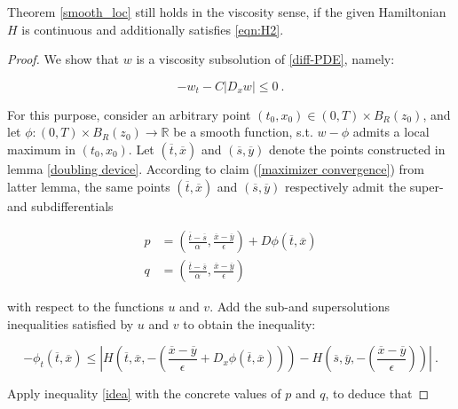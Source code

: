 \begin{theorem}
	\label{viscosity_loc}
		  	Theorem \ref{smooth_loc} still holds in the viscosity sense, if the given Hamiltonian $ H $ is continuous and additionally satisfies \eqref{eqn:H2}.
		  	\begin{proof}
		  		We show that $ w $ is a viscosity subsolution of \ref{diff-PDE}, namely:
		  		
		  		\begin{equation*}
		  			-w_t - C \lvert D_x w \rvert \leq 0 \ .
		  		\end{equation*}
		  		
		  		For this purpose, consider an arbitrary point $ (t_0, x_0) \in \left( 0, T \right) \times B_R(z_0) $, and let $ \phi : \left( 0, T \right) \times B_R(z_0) \to \mathbb{R} $ be a smooth function, s.t. $ w - \phi $ admits a local maximum in $ (t_0, x_0) $. Let $ (\overline{t}, \overline{x}) $ and $ (\overline{s}, \overline{y}) $ denote the points constructed in lemma \ref{doubling device}. According to claim (\ref{maximizer convergence}) from latter lemma, the same points $ (\overline{t}, \overline{x}) $ and $ (\overline{s}, \overline{y}) $ respectively admit the super-and subdifferentials
		  		
		  		\begin{align*}
		  				p &= \left( \frac{\overline{t} - \overline{s}}{\alpha}, \frac{\overline{x} - \overline{y}}{\epsilon} \right) + D\phi(\overline{t}, \overline{x}) \\
		  			q &= \left( \frac{\overline{t} - \overline{s}}{\alpha}, \frac{\overline{x} - \overline{y}}{\epsilon} \right)
		  		\end{align*}
		  		
		  		with respect to the functions $ u $ and $ v. $ Add the sub-and supersolutions inequalities satisfied by $ u $ and $ v $ to obtain the inequality:
		  		
		  		\begin{equation*}
		  			- \phi_t(\overline{t}, \overline{x}) 
		  			\leq \left\lvert H \left( \overline{t}, \overline{x}, - \left( \frac{\overline{x} - \overline{y}}{\epsilon} + D_x \phi(\overline{t}, \overline{x}) \right)  \right)
		  			- H \left( \overline{s}, \overline{y}, - \left( \frac{\overline{x} - \overline{y}}{\epsilon} \right) \right) \right\rvert \ .
		  		\end{equation*}
		  		
		  		Apply inequality \ref{idea} with the concrete values of $ p $ and $ q $, to deduce that
		  		

\end{proof}
\end{theorem}
